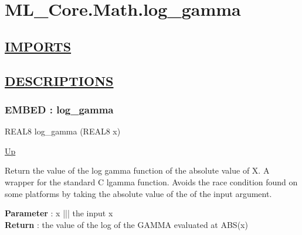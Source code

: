 \chapter*{ML\_Core.Math.log\_gamma}
\hypertarget{ecldoc:toc:ML_Core.Math.log_gamma}{}

\section*{\underline{IMPORTS}}

\section*{\underline{DESCRIPTIONS}}
\subsection*{EMBED : log\_gamma}
\hypertarget{ecldoc:ml_core.math.log_gamma}{}
\begin{minipage}[t]{\textwidth}
\begin{flushleft}
REAL8 log\_gamma (REAL8 x)
\end{flushleft}
\end{minipage}
\hyperlink{ecldoc:toc:ML_Core/Math}{Up}

\par
Return the value of the log gamma function of the absolute value of X. A wrapper for the standard C lgamma function. Avoids the race condition found on some platforms by taking the absolute value of the of the input argument.
\par
\textbf{Parameter} : x ||| the input x \\
\textbf{Return} : the value of the log of the GAMMA evaluated at ABS(x) \\
